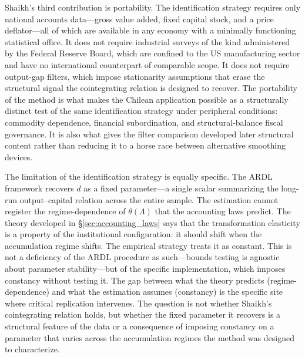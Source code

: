 \documentclass[11pt,a4paper]{article}
\begin{document}
Shaikh's third contribution is portability. The identification strategy requires only national accounts data---gross value added, fixed capital stock, and a price deflator---all of which are available in any economy with a minimally functioning statistical office. It does not require industrial surveys of the kind administered by the Federal Reserve Board, which are confined to the US manufacturing sector and have no international counterpart of comparable scope. It does not require output-gap filters, which impose stationarity assumptions that erase the structural signal the cointegrating relation is designed to recover. The portability of the method is what makes the Chilean application possible as a structurally distinct test of the same identification strategy under peripheral conditions: commodity dependence, financial subordination, and structural-balance fiscal governance. It is also what gives the filter comparison developed later structural content rather than reducing it to a horse race between alternative smoothing devices.

The limitation of the identification strategy is equally specific. The ARDL framework recovers $d$ as a fixed parameter---a single scalar summarizing the long-run output--capital relation across the entire sample. The estimation cannot register the regime-dependence of $\theta(\Lambda)$ that the accounting laws predict. The theory developed in \S\ref{sec:accounting_laws} says that the transformation elasticity is a property of the institutional configuration: it should shift when the accumulation regime shifts. The empirical strategy treats it as constant. This is not a deficiency of the ARDL procedure as such---bounds testing is agnostic about parameter stability---but of the specific implementation, which imposes constancy without testing it. The gap between what the theory predicts (regime-dependence) and what the estimation assumes (constancy) is the specific site where critical replication intervenes. The question is not whether Shaikh's cointegrating relation holds, but whether the fixed parameter it recovers is a structural feature of the data or a consequence of imposing constancy on a parameter that varies across the accumulation regimes the method was designed to characterize.


\end{document}
